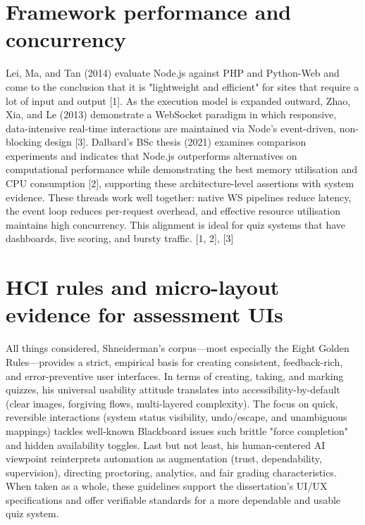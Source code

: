\setlength{\parskip}{1em} 

 \section{Framework performance and concurrency}

\setlength{\parskip}{1em} 

Lei, Ma, and Tan (2014) evaluate Node.js against PHP and Python-Web and come to the conclusion that it is "lightweight and efficient" for sites that require a lot of input and output [1]. As the execution model is expanded outward, Zhao, Xia, and Le (2013) demonstrate a WebSocket paradigm in which responsive, data-intensive real-time interactions are maintained via Node's event-driven, non-blocking design [3]. Dalbard's BSc thesis (2021) examines comparison experiments and indicates that Node.js outperforms alternatives on computational performance while demonstrating the best memory utilisation and CPU consumption [2], supporting these architecture-level assertions with system evidence. These threads work well together: native WS pipelines reduce latency, the event loop reduces per-request overhead, and effective resource utilisation maintains high concurrency. This alignment is ideal for quiz 
systems that have dashboards, live scoring, and bursty traffic. [1, 2], [3]

\setlength{\parskip}{1em}

 \section{HCI rules and micro-layout evidence for assessment UIs}

All things considered, Shneiderman's \cite{wikipediaShneiderman2025} corpus—most especially the Eight Golden Rules—provides a strict, empirical basis for creating consistent, feedback-rich, and error-preventive user interfaces. In terms of creating, taking, and marking quizzes, his universal usability attitude translates into accessibility-by-default (clear images, forgiving flows, multi-layered complexity). The focus on quick, reversible interactions (system status visibility, undo/escape, and unambiguous mappings) tackles well-known Blackboard issues such brittle "force completion" and hidden availability toggles. Last but not least, his human-centered AI viewpoint reinterprets automation as augmentation (trust, dependability, supervision), directing proctoring, analytics, and fair grading characteristics. When taken as a whole, these guidelines support the dissertation's UI/UX specifications and offer verifiable standards for a more dependable and usable quiz system.

